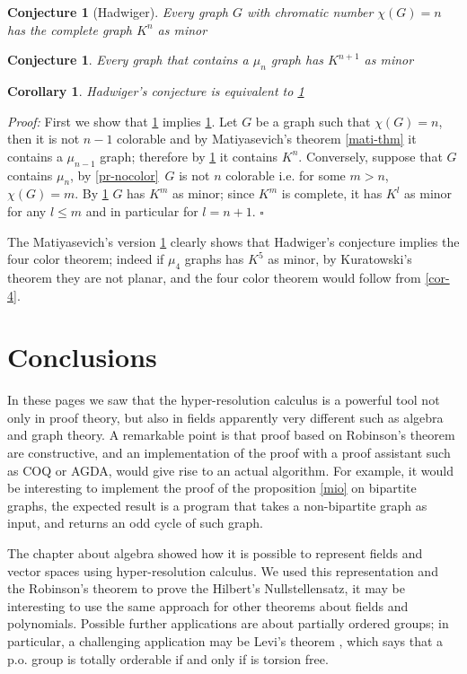 \documentclass[a4paper,12pt,oneside]{book}
\newtheorem{corollary}[theorem]{Corollary}
\newtheorem{conjecture}[theorem]{Conjecture}
\newcommand*{\QED}{\hfill\ensuremath{\square}}
\begin{document}
\begin{conjecture}[Hadwiger]\label{hadw}
Every graph $G$ with chromatic number $\chi (G)=n$ has the complete graph $K^n$  as minor \end{conjecture}

\begin{conjecture}\label{hadw_mu}
Every graph that contains a $\mu_n$ graph has $K^{n+1}$  as minor \end{conjecture}

\begin{corollary}
Hadwiger's conjecture is equivalent to \ref{hadw_mu}\end{corollary}
\textit{Proof:} First we show that \ref{hadw_mu} implies \ref{hadw}. Let $G$ be a graph such that $\chi (G)=n$, then it is not $n-1$ colorable and by Matiyasevich's theorem \ref{mati-thm} it contains a $\mu_{n-1}$ graph; therefore by \ref{hadw_mu} it contains $K^n$.
Conversely, suppose that $G$ contains $\mu_n$, by \ref{pr-nocolor} $\,G$ is not $n$ colorable i.e. for some $m>n$, $\chi (G)=m$. By \ref{hadw} $G$ has $K^m$ as minor; since $K^m$ is complete, it has $K^l$ as minor for any $l\leq m$ and in particular for $l=n+1$. \QED

\noindent The Matiyasevich's version \ref{hadw_mu} clearly shows  that Hadwiger's conjecture implies the four color theorem; indeed if $\mu_4$ graphs has $K^5$ as minor, by Kuratowski's theorem they are not planar, and the four color theorem would follow from \ref{cor-4}.


\chapter*{Conclusions}

In these pages we saw that the hyper-resolution calculus is a powerful tool not only in proof theory, but also in fields apparently very different such as algebra and graph theory. 
A remarkable point is that proof based on Robinson's theorem are constructive, and an implementation of the proof with a  proof assistant such as \textsc{COQ} or \textsc{AGDA}, would give rise to an actual algorithm. 
For example, it would be interesting to implement the proof of the proposition \ref{mio} on bipartite graphs, the expected result is a program that takes a non-bipartite graph as input, and returns an odd cycle of such graph.

The chapter about algebra showed how it is possible to represent fields and vector spaces using hyper-resolution calculus. We used this representation and the Robinson's theorem to prove the Hilbert's Nullstellensatz, it may be interesting to use the same approach for other theorems about fields and polynomials.
Possible further applications are about partially ordered groups; in particular, a challenging application may be Levi's theorem \cite{fuchs}, which says that a p.o. group is totally orderable if and only if is torsion free. 
\end{document}

